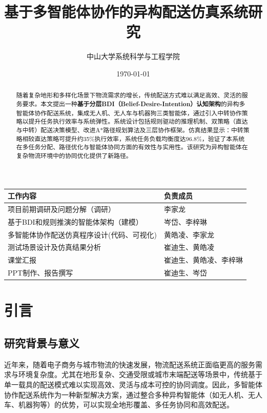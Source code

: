 \documentclass[12pt,a4paper]{article}
\title{基于多智能体协作的异构配送仿真系统研究}
\author{中山大学系统科学与工程学院}
\date{\today}
\begin{document}
\maketitle

\begin{table}[h]
\centering

\label{tab:team-division}
\begin{tabular}{|>{\centering\arraybackslash}p{6cm}|>{\centering\arraybackslash}p{8cm}|}
\hline
\textbf{工作内容} & \textbf{负责成员} \\
\hline
\rowcolor{lightgray}
项目前期调研及问题分解（调研） & 李家龙 \\
\hline
基于BDI和规则推演的智能体架构（建模） & 岑岱、李梓琳 \\
\hline
\rowcolor{lightgray}
多智能体协作配送仿真程序设计(代码、可视化) & 黄皓凌、李家龙 \\
\hline
测试场景设计及仿真结果分析 & 崔迪生、黄皓凌 \\
\hline
\rowcolor{lightgray}
课堂汇报 & 崔迪生、黄皓凌、李梓琳 \\
\hline
PPT制作、报告撰写 & 崔迪生、岑岱 \\
\hline
\end{tabular}
\end{table}

\begin{abstract}
随着复杂地形和多样化场景下物流需求的增长，传统配送方式难以满足高效、灵活的服务要求。本文提出一种\textbf{基于分层BDI（Belief-Desire-Intention）认知架构}的异构多智能体协作配送系统，集成无人机、无人车与机器狗三类智能体，通过引入中转协作策略以提升任务执行效率与系统弹性。系统设计包括规则驱动的推理机制、双策略（直达与中转）配送决策模型、改进A*路径规划算法及三层协作框架。仿真结果显示：中转策略相较直达策略可提升约35\%执行效率，系统任务负载均衡度达96.8\%，验证了本系统在多任务分配、路径优化与智能体协同方面的有效性与实用性。该研究为异构智能体在复杂物流环境中的协同优化提供了新路径。
\end{abstract}
\clearpage
\tableofcontents
\newpage

\section{引言}

\subsection{研究背景与意义}

近年来，随着电子商务与城市物流的快速发展，物流配送系统正面临更高的服务需求与环境复杂度。尤其在地形复杂、交通受限或城市末端配送等场景中，传统基于单一载具的配送模式难以实现高效、灵活与成本可控的协同调度。因此，多智能体协作配送系统作为一种新型解决方案，通过整合多种异构智能体（如无人机、无人车、机器狗等）的优势，可以实现全地形覆盖、多任务协同和高效配送。
\end{document}
